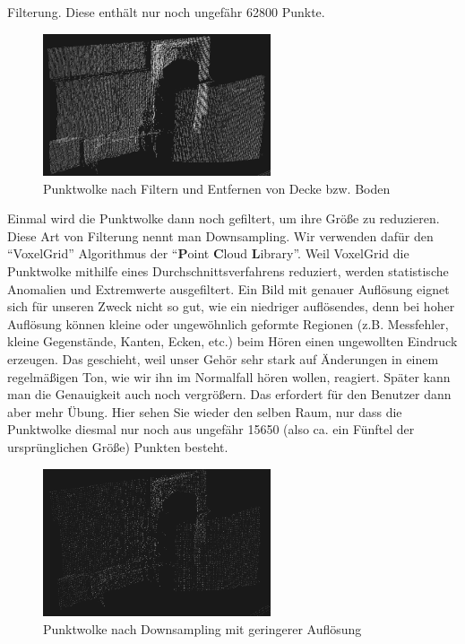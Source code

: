 \documentclass[a4paper,12pt,ngerman]{scrartcl}
\begin{document}
Filterung. Diese enthält nur noch ungefähr 62800 Punkte.
\begin{figure}[H]
	\centering
	\includegraphics[width=0.6\textwidth]{after_filtering}
	\caption{Punktwolke nach Filtern und Entfernen von Decke bzw. Boden}
	\label{after_filtering}
\end{figure}
\par
Einmal wird die Punktwolke dann noch gefiltert, um ihre Größe zu reduzieren. 
Diese Art von Filterung nennt man Downsampling. Wir verwenden dafür den \enquote{VoxelGrid} Algorithmus der \enquote{\textbf{P}oint \textbf{C}loud \textbf{L}ibrary}.
Weil VoxelGrid die Punktwolke mithilfe eines Durchschnittsverfahrens reduziert, 
werden statistische Anomalien und Extremwerte ausgefiltert. Ein Bild mit genauer Auflösung eignet sich für unseren Zweck nicht so gut, wie ein niedriger
auflösendes, denn bei hoher Auflösung können kleine oder ungewöhnlich geformte Regionen (z.B. Messfehler, kleine Gegenstände, Kanten, Ecken, etc.) beim Hören
einen ungewollten Eindruck erzeugen. Das geschieht, weil unser Gehör sehr stark auf 
Änderungen in einem regelmäßigen Ton, wie wir ihn im Normalfall hören wollen, reagiert. Später kann man
die Genauigkeit auch noch vergrößern. Das erfordert für den Benutzer dann aber mehr Übung.
Hier sehen Sie wieder den selben Raum, nur dass die Punktwolke diesmal nur noch aus ungefähr 15650 (also ca. ein Fünftel der ursprünglichen Größe) Punkten besteht. 
\begin{figure}[H]
	\centering
	\includegraphics[width=0.6\textwidth]{after_downsampling}
	\caption{Punktwolke nach Downsampling mit geringerer Auflösung}
	\label{after_downsampling}
\end{figure}
\end{document}
